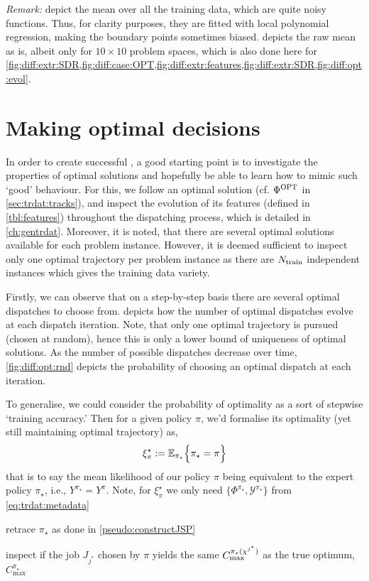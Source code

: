 \emph{Remark:}  
depict the mean over all the training data, which are quite noisy 
functions. Thus, for clarity purposes, they are fitted with local polynomial 
regression, making the boundary points sometimes biased. 
 depicts the raw mean as is, albeit only for $10\times10$ problem 
spaces, which is also done here for 
\cref{fig:diff:extr:SDR,fig:diff:case:OPT,fig:diff:extr:features,fig:diff:extr:SDR,fig:diff:opt:evol}.

\section{Making optimal decisions}
In order to create successful \dr, a good starting point is 
to investigate the properties of optimal solutions and hopefully be able to 
learn how to mimic such `good' behaviour. 
For this, we follow an optimal solution (cf. $\Phi^{\text{OPT}}$ in 
\cref{sec:trdat:tracks}),
and inspect the evolution of its features  (defined in \cref{tbl:features}) 
throughout the dispatching process, which is detailed in \cref{ch:gentrdat}. 
Moreover, it is noted, that there are several optimal solutions available for 
each problem instance. However, it is deemed sufficient to inspect only one 
optimal trajectory per problem instance as there are $N_{\text{train}}$ 
independent instances which gives the training data variety. 

Firstly, we can observe that on a step-by-step basis there are several optimal 
dispatches to choose from.  depicts how the number of 
optimal dispatches evolve at each dispatch iteration. Note, that only one 
optimal trajectory is pursued (chosen at random), hence this is only a lower 
bound of uniqueness of optimal solutions.
As the number of possible dispatches decrease over time, 
\cref{fig:diff:opt:rnd} 
depicts the probability of choosing an optimal dispatch at each iteration. 

To generalise, we could consider the probability of optimality as a sort of 
stepwise `training accuracy.' Then for a given policy $\pi$, we'd formalise its 
optimality (yet still maintaining optimal trajectory) as, 
\begin{equation} \label{eq:tracc:opt}
    \xi^\star_{\pi} := \Exp[\pi_{\star}]{\pi_{\star} = \pi}
\end{equation}
that is to say the mean likelihood of our policy $\pi$ being equivalent to the 
expert policy $\pi_\star$, i.e., $Y^{\pi_\star}=Y^\pi$. Note, for 
$\xi^\star_\pi$ we 
only need $\{\Phi^{\pi_\star},\mathcal{Y}^{\pi_\star}\}$ from 
\cref{eq:trdat:metadata}
\begin{enumerate*}
    \item retrace $\pi_\star$ as done in \cref{pseudo:constructJSP}
    \item inspect if the job $J_{j^*}$ chosen by $\pi$ yields the same 
    $C_{\max}^{\pi_\star({\mathbf{\chi}}^{j^*})}$ as the true optimum, 
    $C_{\max}^{\pi_\star}$
\end{enumerate*}

